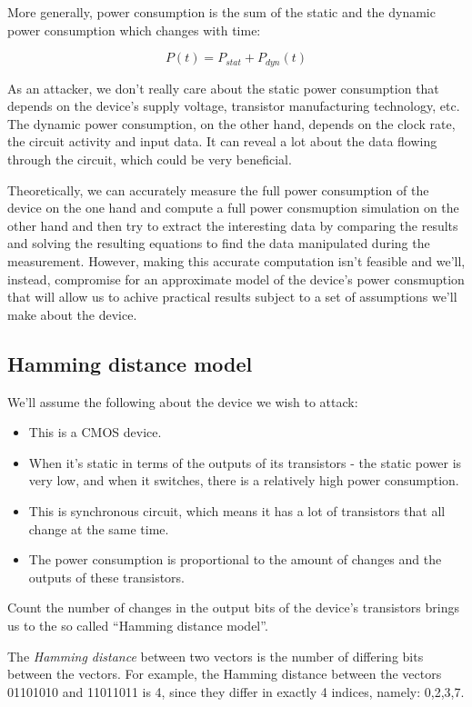 More generally, power consumption is the sum of the static and the dynamic power
consumption which changes with time: 

\begin{displaymath}
    P(t)=P_{stat} + P_{dyn}(t)
\end{displaymath}

As an attacker, we don't really care about the static power consumption that depends on the device's supply voltage, transistor manufacturing technology, etc.
The dynamic power consumption, on the other hand, depends on the clock rate, the circuit activity and input data. It can reveal a lot about the data flowing through the circuit, which could be very beneficial.

Theoretically, we can accurately measure the full power consumption of the device on the one hand and compute a full power consmuption simulation on the other hand and then try to extract the interesting data by comparing the results and solving the resulting equations to find the data manipulated during the measurement.
However, making this accurate computation isn't feasible and we'll, instead, compromise for an approximate model of the device's power consmuption that will allow us to achive practical results subject to a set of assumptions we'll make about the device.

\subsection {Hamming distance model}
We'll assume the following about the device we wish to attack:
\begin{itemize}
    \item This is a CMOS device.
    \item When it's static in terms of the outputs of its transistors - the static power is very low, and when it switches, there is a relatively high power consumption.
    \item This is synchronous circuit, which means it has a lot of transistors
    that all change at the same time.
    \item The power consumption is proportional to the amount of changes and the
    outputs of these transistors.
\end{itemize}

Count the number of changes in the output bits of the device's transistors brings us to the so called ``Hamming distance model''. 

The \textit{Hamming distance} between two vectors is the number of differing bits between the vectors. 
For example, the Hamming distance between the vectors 01101010 and 11011011 is 4, since they differ in exactly 4 indices, namely: 0,2,3,7.

